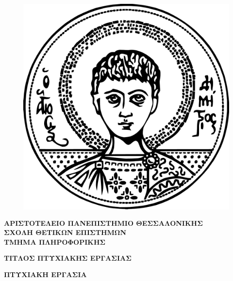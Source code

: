 \begin{figure}[h] %
\vspace*{-1cm}
\centering
\includegraphics[scale=0.35]{pictures/AUThLogo.png}
\end{figure}

\begin{center}
 { \large \bf ΑΡΙΣΤΟΤΕΛΕΙΟ ΠΑΝΕΠΙΣΤΗΜΙΟ ΘΕΣΣΑΛΟΝΙΚΗΣ
  \\ ΣΧΟΛΗ ΘΕΤΙΚΩΝ ΕΠΙΣΤΗΜΩΝ 
   \\ΤΜΗΜΑ ΠΛΗΡΟΦΟΡΙΚΗΣ
    \\}
\vspace{2cm}

{\large \bf ΤΙΤΛΟΣ ΠΤΥΧΙΑΚΗΣ ΕΡΓΑΣΙΑΣ}
    
\vspace{2.5cm}

{\large \bf ΠΤΥΧΙΑΚΗ ΕΡΓΑΣΙΑ
\\ 
  \\}
  
  \vspace{2cm}
  
  {}
\end{center}